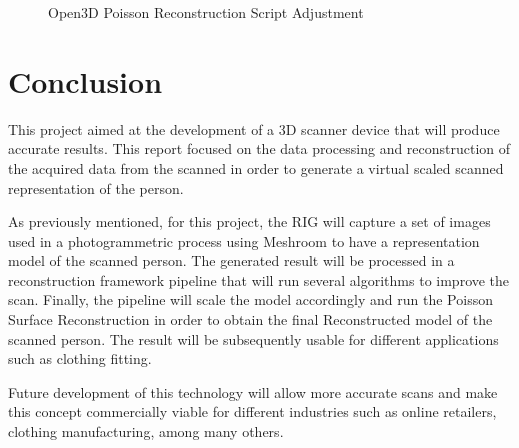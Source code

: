 \documentclass[12pt]{report}
\begin{document}
\begin{figure}[H]
\caption{Open3D Poisson Reconstruction Script Adjustment}
\label{fig:open3dpossionscreipt_result} 
\end{figure}











\chapter{Conclusion}
This project aimed at the development of a 3D scanner device that will produce accurate results. 
This report focused on the data processing and reconstruction of the acquired data from the scanned in order to generate a virtual scaled scanned representation of the person.

As previously mentioned, for this project, the RIG will capture a set of images used in a photogrammetric process using Meshroom to have a representation model of the scanned person. 
The generated result will be processed in a reconstruction framework pipeline that will run several algorithms to improve the scan. 
Finally, the pipeline will scale the model accordingly and run the Poisson Surface Reconstruction in order to obtain the final Reconstructed model of the scanned person. 
The result will be subsequently usable for different applications such as clothing fitting. 

Future development of this technology will allow more accurate scans and make this concept commercially viable for different industries such as online retailers, clothing manufacturing, among many others.
\end{document}
